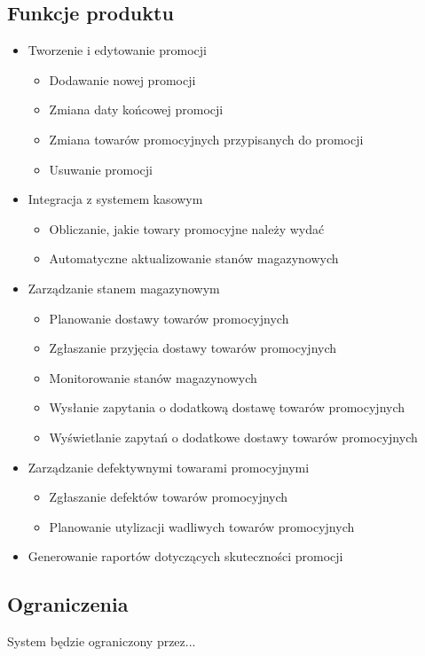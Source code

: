 \documentclass[a4paper,12pt]{article}
\begin{document}
\subsection{Funkcje produktu}
\begin{itemize}
    \item Tworzenie i edytowanie promocji
    \begin{itemize}
        \item Dodawanie nowej promocji
        \item Zmiana daty końcowej promocji
        \item Zmiana towarów promocyjnych przypisanych do promocji
        \item Usuwanie promocji
    \end{itemize}
    \item Integracja z systemem kasowym
    \begin{itemize}
        \item Obliczanie, jakie towary promocyjne należy wydać
        \item Automatyczne aktualizowanie stanów magazynowych
    \end{itemize}
    \item Zarządzanie stanem magazynowym
    \begin{itemize}
        \item Planowanie dostawy towarów promocyjnych
        \item Zgłaszanie przyjęcia dostawy towarów promocyjnych
        \item Monitorowanie stanów magazynowych
        \item Wysłanie zapytania o dodatkową dostawę towarów promocyjnych
        \item Wyświetlanie zapytań o dodatkowe dostawy towarów promocyjnych
    \end{itemize}
    \item Zarządzanie defektywnymi towarami promocyjnymi
    \begin{itemize}
        \item Zgłaszanie defektów towarów promocyjnych
        \item Planowanie utylizacji wadliwych towarów promocyjnych
    \end{itemize}
    \item Generowanie raportów dotyczących skuteczności promocji
\end{itemize}

\subsection{Ograniczenia}
System będzie ograniczony przez...
\end{document}
